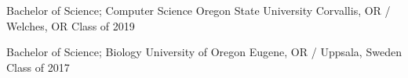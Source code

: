 \showoff
{Bachelor of Science; Computer Science}
{Oregon State University}
{Corvallis, OR / Welches, OR}
{Class of 2019}

\myBreak

\showoff
{Bachelor of Science; Biology}
{University of Oregon}
{Eugene, OR / Uppsala, Sweden}
{Class of 2017}

